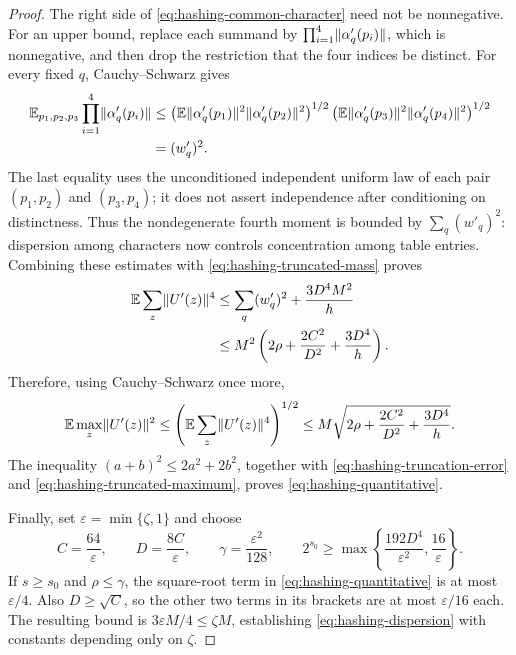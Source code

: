 \begin{proof}
The right side of \eqref{eq:hashing-common-character} need not be
nonnegative.  For an upper bound, replace each summand by
$\prod_{i=1}^4\lVert\alpha'_q(p_i)\rVert$, which is nonnegative, and then
drop the restriction that the four indices be distinct.  For every fixed
$q$, Cauchy--Schwarz gives
\begin{align*}
 \mathbb E_{p_1,p_2,p_3}\prod_{i=1}^4\lVert\alpha'_q(p_i)\rVert
 &\le
 \left(\mathbb E\lVert\alpha'_q(p_1)\rVert^2
             \lVert\alpha'_q(p_2)\rVert^2\right)^{1/2}
 \left(\mathbb E\lVert\alpha'_q(p_3)\rVert^2
             \lVert\alpha'_q(p_4)\rVert^2\right)^{1/2}\\
 &=(w'_q)^2.
\end{align*}
The last equality uses the unconditioned independent uniform law of each
pair $(p_1,p_2)$ and $(p_3,p_4)$; it does not assert independence after
conditioning on distinctness. Thus the nondegenerate fourth moment is
bounded by $\sum_q(w'_q)^2$: dispersion among characters now controls
concentration among table entries. Combining these estimates with
\eqref{eq:hashing-truncated-mass} proves
\begin{align*}
 \mathbb E\sum_z\lVert U'(z)\rVert^4
 &\le \sum_q(w'_q)^2+\frac{3D^4M^2}{h}\\
 &\le M^2\left(2\rho+\frac{2C^2}{D^2}+\frac{3D^4}{h}\right).
\end{align*}
Therefore, using Cauchy--Schwarz once more,
\begin{equation}\label{eq:hashing-truncated-maximum}
 \mathbb E\max_z\lVert U'(z)\rVert^2
 \le\left(\mathbb E\sum_z\lVert U'(z)\rVert^4\right)^{1/2}
 \le M\sqrt{2\rho+\frac{2C^2}{D^2}+\frac{3D^4}{h}}.
\end{equation}
The inequality $(a+b)^2\le2a^2+2b^2$, together with
\eqref{eq:hashing-truncation-error} and
\eqref{eq:hashing-truncated-maximum}, proves
\eqref{eq:hashing-quantitative}.

Finally, set $\varepsilon=\min\{\zeta,1\}$ and choose
\[
 C=\frac{64}{\varepsilon},\qquad
 D=\frac{8C}{\varepsilon},\qquad
 \gamma=\frac{\varepsilon^2}{128},\qquad
 2^{s_0}\ge
 \max\left\{\frac{192D^4}{\varepsilon^2},\frac{16}{\varepsilon}\right\}.
\]
If $s\ge s_0$ and $\rho\le\gamma$, the square-root term in
\eqref{eq:hashing-quantitative} is at most $\varepsilon/4$.
Also $D\ge\sqrt C$, so the other two terms in its brackets are at most
$\varepsilon/16$ each.  The resulting bound is
$3\varepsilon M/4\le\zeta M$, establishing
\eqref{eq:hashing-dispersion} with constants depending only on $\zeta$.
\end{proof}
